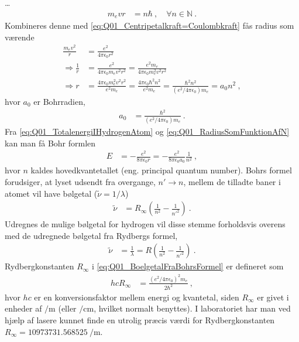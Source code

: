 \ldots
\begin{align}
    m_e v r &= n\hbar \: , \quad \forall n\in \mathbb{N} \: .
\end{align}
Kombineres denne med \cref{eq:Q01_Centripetalkraft=Coulombkraft} fås radius som værende
\begin{align} \label{eq:Q01_RadiusSomFunktionAfN}
    \frac{m_e v^2}{r} &= \frac{e^2}{4\pi\epsilon_0 r^2} \nonumber\\
    \Rightarrow \frac{1}{r} &= \frac{e^2}{4\pi\epsilon_0 m_e v^2 r^2} = \frac{e^2 m_e}{4\pi\epsilon_0 m_e^2 v^2 r^2} \nonumber\\
    \Rightarrow r &= \frac{4\pi\epsilon_0 m_e^2 v^2 r^2}{e^2 m_e} = \frac{4\pi\epsilon_0 \hbar^2 n^2}{e^2 m_e} = \frac{\hbar^2 n^2}{\left(e^2/4\pi\epsilon_0\right) m_e} = a_0 n^2 \: ,
\end{align}
hvor $a_0$ er Bohrradien,
\begin{align}
    a_0 &= \frac{\hbar^2}{\left(e^2/4\pi\epsilon_0\right) m_e} \: .
\end{align}
Fra \cref{eq:Q01_TotalenergiIHydrogenAtom} og \cref{eq:Q01_RadiusSomFunktionAfN} kan man få Bohr formlen
\begin{align} \label{eq:Q01_BohrsFormel}
    E &= - \frac{e^2}{8\pi\epsilon_0 r} = - \frac{e^2}{8\pi\epsilon_0 a_0} \frac{1}{n^2} \: ,
\end{align}
hvor $n$ kaldes \textsf{hovedkvantetallet} (eng. principal quantum number).
Bohrs formel forudsiger, at lyset udsendt fra overgange, $n' \rightarrow n$, mellem de tilladte baner i atomet vil have bølgetal ($\tilde{\nu} = 1/\lambda$)
\begin{align} \label{eq:Q01_BoelgetalFraBohrsFormel}
    \tilde{\nu} &= R_\infty \left(\frac{1}{n^2} - \frac{1}{n'^2}\right) \: .
\end{align}
Udregnes de mulige bølgetal for hydrogen vil disse stemme forholdsvis overens med de udregnede bølgetal fra Rydbergs formel,
\begin{align}
    \tilde{\nu} &= \frac{1}{\lambda} = R \left(\frac{1}{n^2} - \frac{1}{n'^2}\right) \: .
\end{align}
Rydbergkonstanten $R_\infty$ i \cref{eq:Q01_BoelgetalFraBohrsFormel} er defineret som
\begin{align}
    hcR_\infty &= \frac{\left(e^2/4\pi\epsilon_0\right)^2 m_e}{2\hbar^2} \: ,
\end{align}
hvor $hc$ er en konversionsfaktor mellem energi og kvantetal, siden $R_\infty$ er givet i enheder af $\si{\per\metre}$ (eller $\si{\per\centi\metre}$, hvilket normalt benyttes). I laboratoriet har man ved hjælp af lasere kunnet finde en utrolig præcis værdi for Rydbergkonstanten $R_\infty = \SI{10973731.568525}{\per\metre}$.

